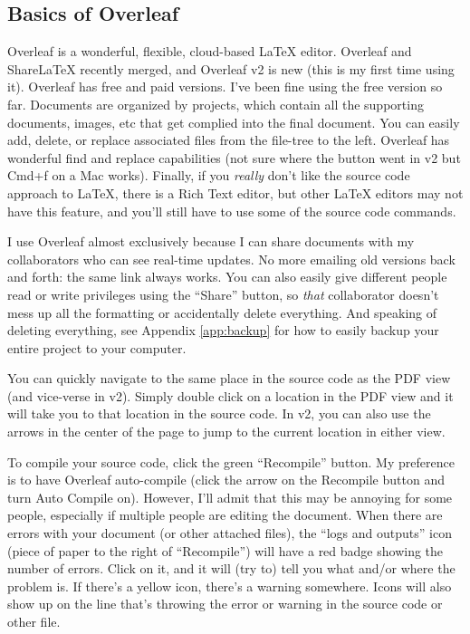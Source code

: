 \documentclass[onecolumn,12pt]{aastex62}
\begin{document}
\subsection{Basics of Overleaf}
\label{ssec:overleafbasics}
Overleaf is a wonderful, flexible, cloud-based LaTeX editor. Overleaf and ShareLaTeX recently merged, and  Overleaf v2 is new (this is my first time using it). Overleaf has free and paid versions. I've been fine using the free version so far. Documents are organized by projects, which contain all the supporting documents, images, etc that get complied into the final document. You can easily add, delete, or replace associated files from the file-tree to the left. Overleaf has wonderful find and replace capabilities (not sure where the button went in v2 but Cmd+f on a Mac works). Finally, if you \textit{really} don't like the source code approach to LaTeX, there is a Rich Text editor, but other LaTeX editors may not have this feature, and you'll still have to use some of the source code commands.

I use Overleaf almost exclusively because I can share documents with my collaborators who can see real-time updates. No more emailing old versions back and forth: the same link always works. You can also easily give different people read or write privileges using the ``Share'' button, so \textit{that} collaborator doesn't mess up all the formatting or accidentally delete everything. And speaking of deleting everything, see Appendix \ref{app:backup} for how to easily backup your entire project to your computer. 

You can quickly navigate to the same place in the source code as the PDF view (and vice-verse in v2). Simply double click on a location in the PDF view and it will take you to that location in the source code. In v2, you can also use the arrows in the center of the page to jump to the current location in either view.

To compile your source code, click the green ``Recompile'' button. My preference is to have Overleaf auto-compile (click the arrow on the Recompile button and turn Auto Compile on). However, I'll admit that this may be annoying for some people, especially if multiple people are editing the document. When there are errors with your document (or other attached files), the ``logs and outputs'' icon (piece of paper to the right of ``Recompile'') will have a red badge showing the number of errors. Click on it, and it will (try to) tell you what and/or where the problem is. If there's a yellow icon, there's a warning somewhere. Icons will also show up on the line that's throwing the error or warning in the source code or other file.
\end{document}
